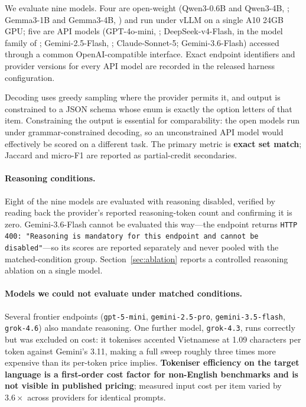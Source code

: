 \documentclass{article} %
\begin{document}
We evaluate nine models. Four are open-weight (Qwen3-0.6B and Qwen3-4B,
\citealp{yang2025qwen3}; Gemma3-1B and Gemma3-4B, \citealp{gemmateam2025gemma3}) and run
under vLLM \citep{kwon2023vllm} on a single A10 24GB GPU; five are API models
(GPT-4o-mini, \citealp{openai2024gpt4o}; DeepSeek-v4-Flash, in the model family of
\citealp{deepseekai2024v3}; Gemini-2.5-Flash, \citealp{comanici2025gemini25};
Claude-Sonnet-5; Gemini-3.6-Flash) accessed through a common OpenAI-compatible interface.
Exact endpoint identifiers and provider versions for every API model are recorded in the
released harness configuration.

Decoding uses greedy sampling where the provider permits it, and output is constrained to a
JSON schema whose enum is exactly the option letters of that item. Constraining the output
is essential for comparability: the open models run under grammar-constrained decoding, so
an unconstrained API model would effectively be scored on a different task. The primary
metric is \textbf{exact set match}; Jaccard and micro-F1 are reported as partial-credit
secondaries.

\paragraph{Reasoning conditions.} Eight of the nine models are evaluated with reasoning
disabled, verified by reading back the provider's reported reasoning-token count and
confirming it is zero. Gemini-3.6-Flash cannot be evaluated this way---the endpoint returns
\texttt{HTTP 400: "Reasoning is mandatory for this endpoint and cannot be disabled"}---so its
scores are reported separately and never pooled with the matched-condition group.
Section~\ref{sec:ablation} reports a controlled reasoning ablation on a single model.

\paragraph{Models we could not evaluate under matched conditions.} Several frontier
endpoints (\texttt{gpt-5-mini}, \texttt{gemini-2.5-pro}, \texttt{gemini-3.5-flash},
\texttt{grok-4.6}) also mandate reasoning. One further model, \texttt{grok-4.3}, runs
correctly but was excluded on cost: it tokenises accented Vietnamese at 1.09 characters per
token against Gemini's 3.11, making a full sweep roughly three times more expensive than its
per-token price implies. \textbf{Tokeniser efficiency on the target language is a
first-order cost factor for non-English benchmarks and is not visible in published
pricing}; measured input cost per item varied by $3.6\times$ across providers for identical
prompts.
\end{document}
